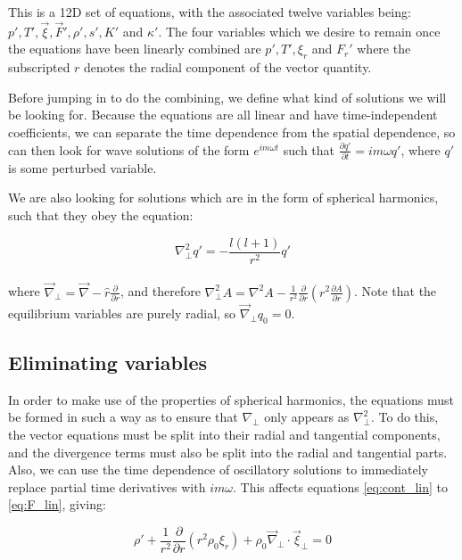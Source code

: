 \documentclass[11pt]{amsart}
\begin{document}
This is a 12D set of equations, with the associated twelve variables being: $p', T', \vec{\xi}, \vec{F}',
\rho', s', K'$ and $\kappa'$.  The four variables which we desire to remain once the equations have been
linearly combined are $p', T', \xi_{r}$ and $F_{r}'$ where the subscripted $r$ denotes the radial component
of the vector quantity.

Before jumping in to do the combining, we define what kind of solutions we will be looking for.  Because the
equations are all linear and have time-independent coefficients, we can separate the time dependence from
the spatial dependence, so can then look for wave solutions of the form $e^{i m \omega t}$ such that
$\frac{\partial q'}{\partial t} = i m \omega q'$, where $q'$ is some perturbed variable.

We are also looking for solutions which are in the form of spherical harmonics, such that they obey the
equation:

\begin{equation} \label{eq:perp}
\nabla_{\perp}^{2} q' = - \frac{l ( l + 1) }{r^2} q'
\end{equation}
\\
where $\vec{\nabla}_{\perp} = \vec{\nabla} - \hat{r} \frac{\partial}{\partial r}$, and therefore $\nabla_{\perp}^{2} A = \nabla^{2}A - \frac{1}{r^{2}} \frac{\partial}{\partial r} \left( r^{2} \frac{\partial A}{\partial r} \right)$.
Note that the equilibrium variables are purely radial, so $\vec{\nabla}_{\perp} q_{0} = 0$.


\subsection{Eliminating variables}

In order to make use of the properties of spherical harmonics, the equations must be formed in such a way as to ensure that
$\nabla_{\perp}$ only appears as $\nabla_{\perp}^{2}$.  To do this, the vector equations must be split into their radial and tangential components,
and the divergence terms must also be split into the radial and tangential parts.  Also, we can use the time dependence of oscillatory solutions to immediately
replace partial time derivatives with $i m \omega$.
This affects equations \ref{eq:cont_lin} to \ref{eq:F_lin}, giving:

\begin{equation} \label{eq:cont_split}
\rho' + \frac{1}{r^{2}} \frac{\partial}{\partial r} ( r^{2} \rho_{0} \xi_{r} ) + \rho_{0} \vec{\nabla}_{\perp} \cdot \vec{\xi}_{\perp} = 0
\end{equation}
\end{document}
